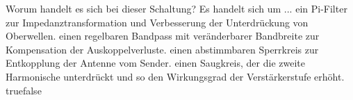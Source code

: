     {Worum handelt es sich bei dieser Schaltung? Es handelt sich um ...}
    {ein Pi-Filter zur Impedanztransformation und Verbesserung der Unterdrückung von Oberwellen.}
    {einen regelbaren Bandpass mit veränderbarer Bandbreite zur Kompensation der Auskoppelverluste.}
    {einen abstimmbaren Sperrkreis zur Entkopplung der Antenne  vom Sender.}
    {einen Saugkreis, der die zweite Harmonische unterdrückt und so den Wirkungsgrad der Verstärkerstufe erhöht.}
    {true}{false}